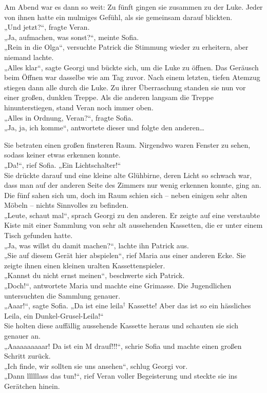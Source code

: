 \documentclass[oneside]{memoir}
\begin{document}
\noindent Am Abend war es dann so weit: Zu fünft gingen sie zusammen zu der Luke. Jeder von ihnen hatte ein mulmiges Gefühl, als sie gemeinsam darauf blickten.  \\
„Und jetzt?“, fragte Veran.  \\
„Ja, aufmachen, was sonst?“, meinte Sofia.  \\
„Rein in die Olga“, versuchte Patrick die Stimmung wieder zu erheitern, aber niemand lachte.  \\
„Alles klar“, sagte Georgi und bückte sich, um die Luke zu öffnen. Das Geräusch beim Öffnen war dasselbe wie am Tag zuvor. Nach einem letzten, tiefen Atemzug stiegen dann alle durch die Luke. Zu ihrer Überraschung standen sie nun vor einer großen, dunklen Treppe. Als die anderen langsam die Treppe hinunterstiegen, stand Veran noch immer oben.  \\
„Alles in Ordnung, Veran?“, fragte Sofia. \\
„Ja, ja, ich komme“, antwortete dieser und folgte den anderen\ldots

\bigskip
\noindent Sie betraten einen großen finsteren Raum. Nirgendwo waren Fenster zu sehen, sodass keiner etwas erkennen konnte. \\
„Da!“, rief Sofia. „Ein Lichtschalter!“ \\
Sie drückte darauf und eine kleine alte Glühbirne, deren Licht so schwach war, dass man auf der anderen Seite des Zimmers nur wenig erkennen konnte, ging an.
Die fünf sahen sich um, doch im Raum schien sich -- neben einigen sehr alten Möbeln -- nichts Sinnvolles zu befinden. \\
„Leute, schaut mal“, sprach Georgi zu den anderen. Er zeigte auf eine verstaubte Kiste mit einer Sammlung von sehr alt aussehenden Kassetten, die er unter einem Tisch gefunden hatte. \\
„Ja, was willst du damit machen?“, lachte ihn Patrick aus. \\
„Sie auf diesem Gerät hier abspielen“, rief Maria aus einer anderen Ecke. Sie zeigte ihnen einen kleinen uralten Kassettenspieler. \\
„Kannst du nicht ernst meinen“, beschwerte sich Patrick. \\
„Doch!“, antwortete Maria und machte eine Grimasse.
Die Jugendlichen untersuchten die Sammlung genauer. \\
„Aaar!“, sagte Sofia. „Da ist eine leila$^{\dagger}$ Kassette! Aber das ist so ein hässliches Leila, ein Dunkel-Grusel-Leila!“ \\
Sie holten diese auffällig aussehende Kassette heraus und schauten sie sich genauer an. \\
„Aaaaaaaaaar! Da ist ein M drauf!!!“, schrie Sofia und machte einen großen Schritt zurück. \\
„Ich finde, wir sollten sie uns ansehen“, schlug Georgi vor. \\
„Dann llllllass das tun!“, rief Veran voller Begeisterung und steckte sie ins Gerätchen hinein.
     
\end{document}
